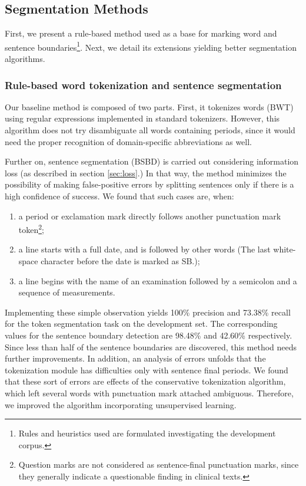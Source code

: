 \subsection{Segmentation Methods}
\label{sec:clinical_segmentation}

First, we present a rule-based method used as a base for marking word and sentence boundaries\footnote{Rules and heuristics used are formulated investigating the development corpus.}. 
Next, we detail its extensions yielding better segmentation algorithms. 

\subsubsection{Rule-based word tokenization and sentence segmentation}

Our baseline method is composed of two parts. 
First, it tokenizes words (BWT) using regular expressions implemented in standard tokenizers. %
However, this algorithm does not try disambiguate all words containing periods, since it would need the proper recognition of domain-specific abbreviations as well. %

Further on, sentence segmentation (BSBD) is carried out considering information loss (as described in section \ref{sec:loss}.) 
In that way, the method minimizes the possibility of making false-positive errors by splitting sentences only if there is a high confidence of success. 
We found that such cases are, when:
\begin{enumerate} 
 \item a period or exclamation mark directly follows another punctuation mark token\footnote{Question marks are not considered as sentence-final punctuation marks, since they generally indicate a questionable finding in clinical texts.};
 \item a line starts with a full date, and is followed by other words (The last white-space character before the date is marked as SB.);
 \item a line begins with the name of an examination followed by a semicolon and a sequence of measurements.
\end{enumerate}

Implementing these simple observation yields 100\% precision and 73.38\% recall for the token segmentation task on the development set. 
The corresponding values for the sentence boundary detection are 98.48\% and 42.60\% respectively. 
Since less than half of the sentence boundaries are discovered, this method needs further improvements.
In addition, an analysis of errors unfolds that the tokenization module has difficulties only with sentence final periods. 
We found that these sort of errors are effects of the conservative tokenization algorithm, which left several words with punctuation mark attached ambiguous.
Therefore, we improved the algorithm incorporating unsupervised learning.


